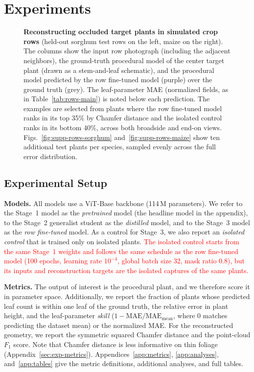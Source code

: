 \documentclass[10pt,twocolumn,letterpaper]{article}
\begin{document}
\section{Experiments}
\label{sec:results}\label{sec:experiments}

\begin{figure}[t]
  \centering
  \resizebox{\linewidth}{!}{}
  \caption{\textbf{Reconstructing occluded target plants in simulated crop rows} (held-out sorghum test rows on the left, maize on the right). The columns show the input row photograph (including the adjacent neighbors), the ground-truth procedural model of the center target plant (drawn as a stem-and-leaf schematic), and the procedural model predicted by the row fine-tuned model (purple) over the ground truth (grey). The leaf-parameter MAE (normalized fields, as in Table~\ref{tab:rows-main}) is noted below each prediction. The examples are selected from plants where the row fine-tuned model ranks in its top 35\% by Chamfer distance and the isolated control ranks in its bottom 40\%, across both broadside and end-on views. Figs.~\ref{fig:supp-rows-sorghum} and~\ref{fig:supp-rows-maize} show ten additional test plants per species, sampled evenly across the full error distribution.}
  \label{fig:rowsex}
\end{figure}

\subsection{Experimental Setup}
\label{sec:setup}\label{sec:exp-setup}

\noindent\textbf{Models.}
All models use a ViT-Base backbone (114\,M parameters). We refer to the Stage~1 model as the \emph{pretrained} model (the headline model in the appendix), to the Stage~2 generalist student as the \emph{distilled} model, and to the Stage~3 model as the \emph{row fine-tuned} model. As a control for Stage~3, we also report an \emph{isolated control} that is trained only on isolated plants. \textcolor{red}{The isolated control starts from the same Stage~1 weights and follows the same schedule as the row fine-tuned model (100 epochs, learning rate $10^{-4}$, global batch size 32, mask ratio 0.8), but its inputs and reconstruction targets are the isolated captures of the same plants.}

\noindent\textbf{Metrics.}
The output of interest is the procedural plant, and we therefore score it in parameter space. Additionally, we report the fraction of plants whose predicted leaf count is within one leaf of the ground truth, the relative error in plant height, and the leaf-parameter \emph{skill} ($1 - \mathrm{MAE}/\mathrm{MAE}_{\mathrm{mean}}$, where $0$ matches predicting the dataset mean) or the normalized MAE. For the reconstructed geometry, we report the symmetric squared Chamfer distance and the point-cloud $F_1$ score. Note that Chamfer distance is less informative on thin foliage (Appendix~\ref{sec:exp-metrics}). Appendices~\ref{app:metrics}, \ref{app:analyses}, and~\ref{app:tables} give the metric definitions, additional analyses, and full tables.
\end{document}
